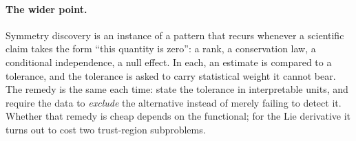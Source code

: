 \paragraph{The wider point.} Symmetry discovery is an instance of a pattern
that recurs whenever a scientific claim takes the form ``this quantity is
zero'': a rank, a conservation law, a conditional independence, a null effect.
In each, an estimate is compared to a tolerance, and the tolerance is asked to
carry statistical weight it cannot bear. The remedy is the same each time:
state the tolerance in interpretable units, and require the data to
\emph{exclude} the alternative instead of merely failing to detect it. Whether
that remedy is cheap depends on the functional; for the Lie derivative it
turns out to cost two trust-region subproblems.
